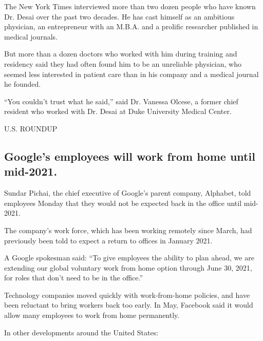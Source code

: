 The New York Times interviewed more than two dozen people who have known
Dr. Desai over the past two decades. He has cast himself as an ambitious
physician, an entrepreneur with an M.B.A. and a prolific researcher
published in medical journals.

But more than a dozen doctors who worked with him during training and
residency said they had often found him to be an unreliable physician,
who seemed less interested in patient care than in his company and a
medical journal he founded.

``You couldn't trust what he said,'' said Dr. Vanessa Olcese, a former
chief resident who worked with Dr. Desai at Duke University Medical
Center.

U.S. ROUNDUP

\hypertarget{googles-employees-will-work-from-home-until-mid-2021}{%
\subsection{Google's employees will work from home until
mid-2021.}\label{googles-employees-will-work-from-home-until-mid-2021}}

Sundar Pichai, the chief executive of Google's parent company, Alphabet,
told employees Monday that they would not be expected back in the office
until mid-2021.

The company's work force, which has been working remotely since March,
had previously been told to expect a return to offices in January 2021.

A Google spokesman said: ``To give employees the ability to plan ahead,
we are extending our global voluntary work from home option through June
30, 2021, for roles that don't need to be in the office.''

Technology companies moved quickly with work-from-home policies, and
have been reluctant to bring workers back too early. In May, Facebook
said it would allow many employees to work from home permanently.

In other developments around the United States:


